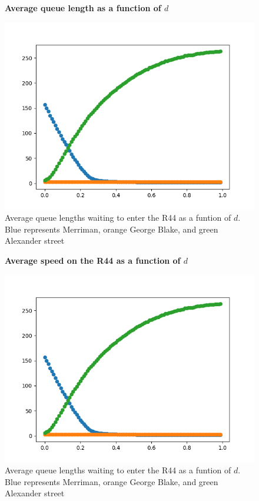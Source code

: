 \documentclass{article}
\begin{document}
\begin{figure}
\textbf{\large Average queue length as a function of $d$}\par\medskip
{}
\includegraphics[scale = 0.55, left]{./data/phase4/queues_vs_d.png}
\vspace*{0.1cm}\hspace*{4.5cm}{\large $d$}
\caption{\label{fig} Average queue lengths waiting to enter the R44 as a funtion of $d$. Blue represents Merriman, orange George Blake, and green Alexander street}
\end{figure}

\begin{figure}
\textbf{\large Average speed on the R44 as a function of $d$}\par\medskip
{}
\includegraphics[scale = 0.55, left]{./data/phase4/queues_vs_d.png}
\vspace*{0.1cm}\hspace*{4.5cm}{\large $d$}
\caption{\label{fig} Average queue lengths waiting to enter the R44 as a funtion of $d$. Blue represents Merriman, orange George Blake, and green Alexander street}
\end{figure}
\end{document}
